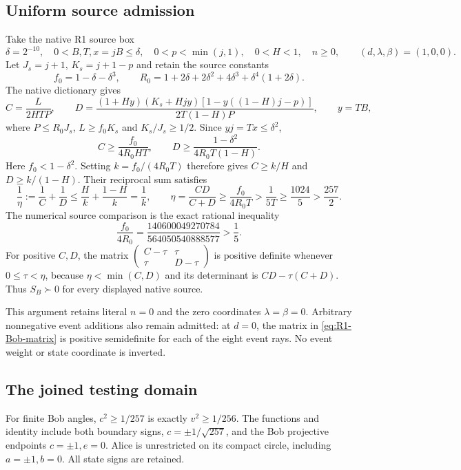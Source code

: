 \subsection*{Uniform source admission}
Take the native R1 source box
\[
 \delta=2^{-10},\quad 0<B,T,x=jB\leq\delta,\quad
 0<p<\min(j,1),\quad0<H<1,\quad n\geq0,
 \qquad(d,\lambda,\beta)=(1,0,0).
\]
Let $J_s=j+1$, $K_s=j+1-p$ and retain the source constants
\[
 f_0=1-\delta-\delta^3,\qquad
 R_0=1+2\delta+2\delta^2+4\delta^3+\delta^4(1+2\delta).
\]
The native dictionary gives
\[
 C=\frac{L}{2HTP},\qquad
 D=\frac{(1+Hy)(K_s+Hjy)[1-y((1-H)j-p)]}{2T(1-H)P},
 \qquad y=TB,
\]
where $P\leq R_0J_s$, $L\geq f_0K_s$ and $K_s/J_s\geq1/2$.
Since $yj=Tx\leq\delta^2$,
\begin{equation}
 C\geq\frac{f_0}{4R_0HT},\qquad
 D\geq\frac{1-\delta^2}{4R_0T(1-H)}.
 \label{eq:R1-Bob-source-bounds}
\end{equation}
Here $f_0<1-\delta^2$. Setting $k=f_0/(4R_0T)$ therefore gives
$C\geq k/H$ and $D\geq k/(1-H)$. Their reciprocal sum satisfies
\[
 \frac1\eta:=\frac1C+\frac1D\leq\frac Hk+\frac{1-H}k=\frac1k,
 \qquad
 \eta=\frac{CD}{C+D}\geq\frac{f_0}{4R_0T}
                   >\frac1{5T}\geq\frac{1024}{5}>\frac{257}{2}.
\]
The numerical source comparison is the exact rational inequality
\[
 \frac{f_0}{4R_0}=\frac{140600049270784}{564050540888577}>\frac15.
\]
For positive $C,D$, the matrix
$\left(\begin{smallmatrix}C-\tau&\tau\\\tau&D-\tau\end{smallmatrix}\right)$
is positive definite whenever $0\leq\tau<\eta$, because
$\eta<\min(C,D)$ and its determinant is $CD-\tau(C+D)$.
Thus $S_B\succ0$ for every displayed native source.

This argument retains literal $n=0$ and the zero coordinates
$\lambda=\beta=0$. Arbitrary nonnegative event additions also remain
admitted: at $d=0$, the matrix in \eqref{eq:R1-Bob-matrix} is positive
semidefinite for each of the eight event rays. No event weight or
state coordinate is inverted.

\subsection*{The joined testing domain}
For finite Bob angles,
$c^2\geq1/257$ is exactly $v^2\geq1/256$. The functions and identity
include both boundary signs, $c=\pm1/\sqrt{257}$, and the Bob
projective endpoints $c=\pm1,e=0$. Alice is unrestricted on its
compact circle, including $a=\pm1,b=0$. All state signs are retained.

